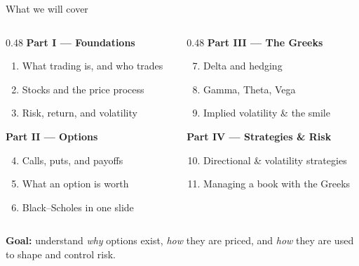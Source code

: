 \documentclass[11pt,aspectratio=169]{beamer}
\newcommand{\keybox}[1]{%
  \begin{beamercolorbox}[wd=\textwidth,sep=0.6em,rounded=true]{}%
    \colorbox{soft}{\parbox{\dimexpr\textwidth-1.4em}{\color{ink}#1}}%
  \end{beamercolorbox}}
\begin{document}
\begin{frame}{What we will cover}
  \begin{columns}[T]
    \begin{column}{0.48\textwidth}
      \textbf{\color{accent}Part I — Foundations}
      \begin{enumerate}
        \item What trading is, and who trades
        \item Stocks and the price process
        \item Risk, return, and volatility
      \end{enumerate}
      \vspace{0.8em}
      \textbf{\color{accent}Part II — Options}
      \begin{enumerate}\setcounter{enumi}{3}
        \item Calls, puts, and payoffs
        \item What an option is worth
        \item Black–Scholes in one slide
      \end{enumerate}
    \end{column}
    \begin{column}{0.48\textwidth}
      \textbf{\color{accent}Part III — The Greeks}
      \begin{enumerate}\setcounter{enumi}{6}
        \item Delta and hedging
        \item Gamma, Theta, Vega
        \item Implied volatility \& the smile
      \end{enumerate}
      \vspace{0.8em}
      \textbf{\color{accent}Part IV — Strategies \& Risk}
      \begin{enumerate}\setcounter{enumi}{9}
        \item Directional \& volatility strategies
        \item Managing a book with the Greeks
      \end{enumerate}
    \end{column}
  \end{columns}
  \vfill
  \keybox{\textbf{Goal:} understand \emph{why} options exist, \emph{how} they are priced, and \emph{how} they are used to shape and control risk.}
\end{frame}
\end{document}
